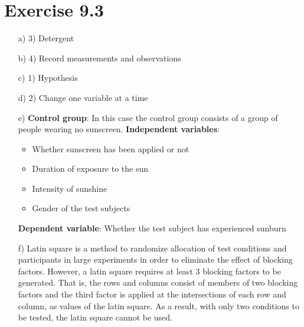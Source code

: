 \documentclass[a4paper]{article}
\begin{document}
\section*{Exercise 9.3}
\begin{enumerate}
	\item[a)] 3) Detergent
	\item[b)] 4) Record measurements and observations
	\item[c)] 1) Hypothesis
	\item[d)] 2) Change one variable at a time
	\item[e)] \textbf{Control group}: In this case the control group consists of a group of people wearing no sunscreen.\linebreak
	\textbf{Independent variables}:\begin{itemize}
		\item Whether sunscreen has been applied or not
		\item Duration of exposure to the sun
		\item Intensity of sunshine
		\item Gender of the test subjects
	\end{itemize}
\textbf{Dependent variable}: Whether the test subject has experienced sunburn
\item[f)] Latin square is a method to randomize allocation of test conditions and participants in large experiments in order to eliminate the effect of blocking factors. However, a latin square requires at least 3 blocking factors to be generated. That is, the rows and columns consist of members of two blocking factors and the third factor is applied at the intersections of each row and column, as values of the latin square. As a result, with only two conditions to be tested, the latin square cannot be used. 
\end{enumerate}
\end{document}
